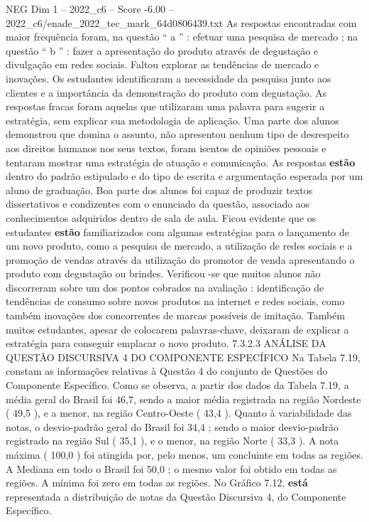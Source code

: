 \begin{textsample}{NEG Dim 1 – 2022\_c6 – Score -6.00 – 2022\_c6/enade\_2022\_tec\_mark\_64d0806439.txt}
As respostas encontradas com maior frequência foram, na questão “ a ” : efetuar uma pesquisa de mercado ; na questão “ b ” : fazer a apresentação do produto através de degustação e divulgação em redes sociais.
Faltou explorar as tendências de mercado e inovações.
Os estudantes identificaram a necessidade da pesquisa junto aos clientes e a importância da demonstração do produto com degustação.
As respostas fracas foram aquelas que utilizaram uma palavra para sugerir a estratégia, sem explicar sua metodologia de aplicação.
Uma parte dos alunos demonstrou que domina o assunto, não apresentou nenhum tipo de desrespeito aos direitos humanos nos seus textos, foram isentos de opiniões pessoais e tentaram mostrar uma estratégia de atuação e comunicação.
As respostas \textbf{estão} dentro do padrão estipulado e do tipo de escrita e argumentação esperada por um aluno de graduação.
Boa parte dos alunos foi capaz de produzir textos dissertativos e condizentes com o enunciado da questão, associado aos conhecimentos adquiridos dentro de sala de aula.
Ficou evidente que os estudantes \textbf{estão} familiarizados com algumas estratégias para o lançamento de um novo produto, como a pesquisa de mercado, a utilização de redes sociais e a promoção de vendas através da utilização do promotor de venda apresentando o produto com degustação ou brindes.
Verificou -se que muitos alunos não discorreram sobre um dos pontos cobrados na avaliação : identificação de tendências de consumo sobre novos produtos na internet e redes sociais, como também inovações dos concorrentes de marcas possíveis de imitação.
Também muitos estudantes, apesar de colocarem palavras-chave, deixaram de explicar a estratégia para conseguir emplacar o novo produto. 7.3.2.3 ANÁLISE DA QUESTÃO DISCURSIVA 4 DO COMPONENTE ESPECÍFICO Na Tabela 7.19, constam as informações relativas à Questão 4 do conjunto de Questões do Componente Específico.
Como se observa, a partir dos dados da Tabela 7.19, a média geral do Brasil foi 46,7, sendo a maior média registrada na região Nordeste ( 49,5 ), e a menor, na região Centro-Oeste ( 43,4 ).
Quanto à variabilidade das notas, o desvio-padrão geral do Brasil foi 34,4 ; sendo o maior desvio-padrão registrado na região Sul ( 35,1 ), e o menor, na região Norte ( 33,3 ).
A nota máxima ( 100,0 ) foi atingida por, pelo menos, um concluinte em todas as regiões.
A Mediana em todo o Brasil foi 50,0 ; o mesmo valor foi obtido em todas as regiões.
A mínima foi zero em todas as regiões.
No Gráfico 7.12, \textbf{está} representada a distribuição de notas da Questão Discursiva 4, do Componente Específico.

\end{textsample}
